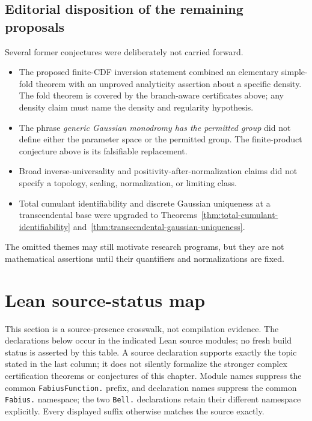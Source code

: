 \subsection{Editorial disposition of the remaining proposals}

Several former conjectures were deliberately not carried forward.

\begin{itemize}
\item The proposed finite-CDF inversion statement combined an elementary
  simple-fold theorem with an unproved analyticity assertion about a specific
  density.  The fold theorem is covered by the branch-aware certificates
  above; any density claim must name the density and regularity hypothesis.
\item The phrase \emph{generic Gaussian monodromy has the permitted group}
  did not define either the parameter space or the permitted group.  The
  finite-product conjecture above is its falsifiable replacement.
\item Broad inverse-universality and positivity-after-normalization claims did
  not specify a topology, scaling, normalization, or limiting class.
\item Total cumulant identifiability and discrete Gaussian uniqueness at a
  transcendental base were upgraded to
  Theorems~\ref{thm:total-cumulant-identifiability}
  and~\ref{thm:transcendental-gaussian-uniqueness}.
\end{itemize}

The omitted themes may still motivate research programs, but they are not
mathematical assertions until their quantifiers and normalizations are fixed.

\section{Lean source-status map}
\label{sec:lean-certification-map}

This section is a source-presence crosswalk, not compilation evidence.  The
declarations below occur in the indicated Lean source modules; no fresh build
status is asserted by this table.  A source declaration supports exactly the
topic stated in the last column; it does not silently formalize the stronger
complex certification theorems or conjectures of this chapter.  Module names
suppress the common
\nolinkurl{FabiusFunction.} prefix, and declaration names suppress the common
\nolinkurl{Fabius.} namespace; the two \nolinkurl{Bell.} declarations retain
their different namespace explicitly.  Every displayed suffix otherwise
matches the source exactly.

